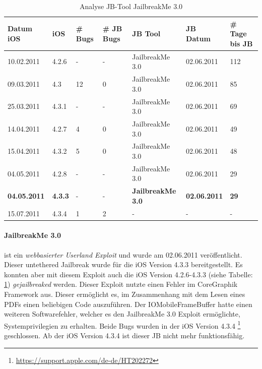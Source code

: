 \begin{table}[hp!]
    \begin{center}
        \begin{tabular}{| p{20mm} | p{12mm} | p{17mm} | p{12mm} | p{32mm} | p{22mm} | p{15mm} |} \hline
             \textbf{Datum iOS} & \textbf{iOS} & \textbf{\# Bugs} & \textbf{\# JB Bugs} & \textbf{JB Tool} & \textbf{JB Datum} & \textbf{\# Tage bis JB} \\ \hline 
            10.02.2011 & 4.2.6 &  - & -  & JailbreakMe 3.0 & 02.06.2011 & 112 \\ \hline
             09.03.2011 & 4.3 & 12 & 0 & JailbreakMe 3.0 &	02.06.2011 & 85 \\ \hline
             25.03.2011 & 4.3.1 &  - & - & JailbreakMe 3.0 & 02.06.2011 & 69 \\ \hline
            14.04.2011 & 4.2.7 &  4 & 0 & JailbreakMe 3.0 & 02.06.2011 & 49 \\ \hline
             15.04.2011 & 4.3.2 & 5 & 0 & JailbreakMe 3.0 & 02.06.2011 & 48 \\ \hline
             04.05.2011 & 4.2.8 &  - & - & JailbreakMe 3.0 & 02.06.2011 & 29 \\ \hline
            \textbf{04.05.2011} & \textbf{4.3.3} &  - & -  & \textbf{JailbreakMe 3.0} & \textbf{02.06.2011} & \textbf{29} \\ \hline
            15.07.2011 & 4.3.4 &  1 & 2	 & - & - & - \\ \hline
        \end{tabular} 
        \caption{Analyse JB-Tool JailbreakMe 3.0 \protect\footnotemark}         
        \label{tab:AnalyseJailbreakMe3.0}
    \end{center}
\end{table}

\paragraph{JailbreakMe 3.0} ist ein \textit{\glqq webbasierter Userland Exploit\grqq{}} und wurde am 02.06.2011 veröffentlicht. Dieser untethered Jailbreak wurde für die iOS Version 4.3.3 bereitgestellt. Es konnten aber mit diesem Exploit auch die iOS Version 4.2.6-4.3.3 (siehe Tabelle: \ref{tab:AnalyseJailbreakMe3.0})  \textit{\glqq gejailbreaked\grqq{}} werden. 
Dieser Exploit nutzte einen Fehler im CoreGraphik Framework aus. Dieser ermöglicht es, im Zusammenhang mit dem Lesen eines PDFs einen beliebigen Code auszuführen. Der IOMobileFrameBuffer hatte einen weiteren Softwarefehler, welcher es den JailbreakMe 3.0 Exploit ermöglichte, Systemprivilegien zu erhalten. Beide Bugs wurden in der iOS Version 4.3.4 \footnote{\label{foot:iOS4.3.4}{\url{https://support.apple.com/de-de/HT202272}}} geschlossen. Ab der iOS Version 4.3.4 ist dieser JB nicht mehr funktionsfähig.
 
